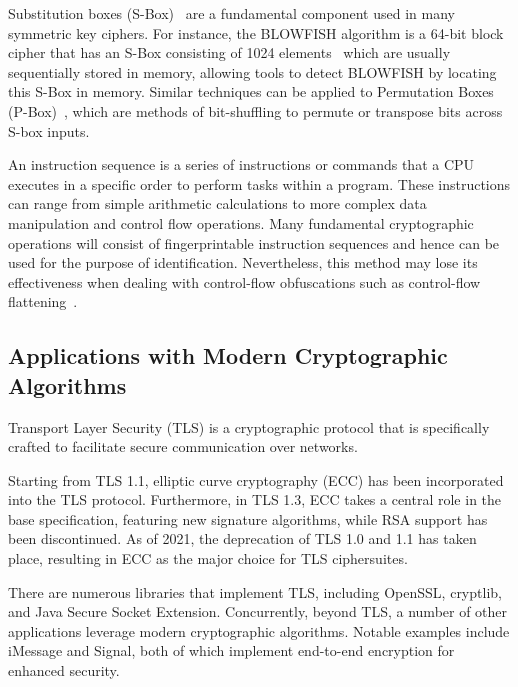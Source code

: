  Substitution boxes (S-Box)~\cite{sbox} are a fundamental component used in many symmetric key ciphers.
For instance, the BLOWFISH algorithm
is a 64-bit block cipher that has an S-Box consisting of 1024 elements~\cite{jia2020neural} which are usually
sequentially stored in memory, allowing tools to detect BLOWFISH by locating this S-Box in memory. Similar techniques can be applied to Permutation Boxes (P-Box)~\cite{pbox}, which are methods of bit-shuffling to permute or transpose bits across S-box inputs.


 An instruction sequence is a series of instructions or commands that a CPU executes in a specific order to perform tasks within a program. These instructions can range from simple arithmetic calculations to more complex data manipulation and control flow operations. 
Many fundamental cryptographic operations will consist of fingerprintable instruction sequences and hence can be used for the purpose of identification. Nevertheless, this method may lose its effectiveness when dealing with control-flow obfuscations such as control-flow flattening~\cite{cfg_f}.




\subsection{Applications with Modern Cryptographic Algorithms}

Transport Layer Security (TLS) is a cryptographic protocol that is specifically crafted to facilitate secure communication over networks.

Starting from TLS 1.1, elliptic curve cryptography (ECC) has been incorporated into the TLS protocol. Furthermore, in TLS 1.3, ECC takes a central role in the base specification, featuring new signature algorithms, while RSA support has been discontinued. As of 2021, the deprecation of TLS 1.0 and 1.1 has taken place, resulting in ECC as the major choice for TLS ciphersuites.

There are numerous libraries that implement TLS, including OpenSSL, cryptlib, and Java Secure Socket Extension. Concurrently, beyond TLS, a number of other applications leverage modern cryptographic algorithms. Notable examples include iMessage and Signal, both of which implement end-to-end encryption for enhanced security.

